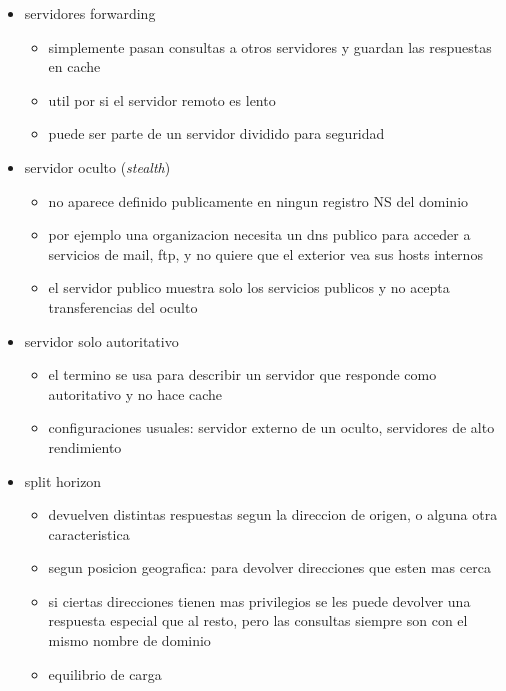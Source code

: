 \documentclass[11pt]{article}
\begin{document}
\begin{itemize}
\item servidores forwarding
\begin{itemize}
\item simplemente pasan consultas a otros servidores y guardan las respuestas en cache
\item util por si el servidor remoto es lento
\item puede ser parte de un servidor dividido para seguridad
\end{itemize}
\item servidor oculto (\emph{stealth})
\begin{itemize}
\item no aparece definido publicamente en ningun registro NS del dominio
\item por ejemplo una organizacion necesita un dns publico para acceder a servicios de mail, ftp, y no quiere que el exterior vea sus hosts internos
\item el servidor publico muestra solo los servicios publicos y no acepta transferencias del oculto
\end{itemize}
\item servidor solo autoritativo
\begin{itemize}
\item el termino se usa para describir un servidor que responde como autoritativo y no hace cache
\item configuraciones usuales: servidor externo de un oculto, servidores de alto rendimiento
\end{itemize}
\item split horizon
\begin{itemize}
\item devuelven distintas respuestas segun la direccion de origen, o alguna otra caracteristica
\item segun posicion geografica: para devolver direcciones que esten mas cerca
\item si ciertas direcciones tienen mas privilegios se les puede devolver una respuesta especial que al resto, pero las consultas siempre son con el mismo nombre de dominio
\item equilibrio de carga
\end{itemize}
\end{itemize}
\end{document}

